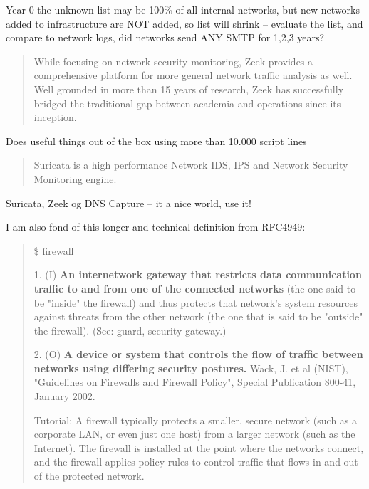 \documentclass[Screen16to9,17pt]{foils}
\begin{document}
Year 0 the unknown list may be 100\% of all internal networks, but new networks added to infrastructure are NOT added, so list will shrink -- evaluate the list, and compare to network logs, did networks send ANY SMTP for 1,2,3 years?



\begin{quote}
While focusing on network security monitoring, Zeek provides a comprehensive platform for more general network traffic analysis as well. Well grounded in more than 15 years of research, Zeek has successfully bridged the traditional gap between academia and operations since its inception.
\end{quote}

Does useful things out of the box using more than 10.000 script lines


\begin{quote}
Suricata is a high performance Network IDS, IPS and Network Security Monitoring engine.
\end{quote}


Suricata, Zeek og DNS Capture -- it a nice world, use it!\\
{\small{}}




I am also fond of this longer and technical definition from RFC4949:
\begin{quote}
\$ firewall

      1. (I) {\bf An internetwork gateway that restricts data communication
      traffic to and from one of the connected networks} (the one said to
      be "inside" the firewall) and thus protects that network's system
      resources against threats from the other network (the one that is
      said to be "outside" the firewall). (See: guard, security
      gateway.)

      2. (O) {\bf A device or system that controls the flow of traffic
      between networks using differing security postures.} Wack, J. et al (NIST), "Guidelines on Firewalls and Firewall Policy", Special Publication 800-41,
      January 2002.

      Tutorial: A firewall typically protects a smaller, secure network
      (such as a corporate LAN, or even just one host) from a larger
      network (such as the Internet). The firewall is installed at the
      point where the networks connect, and the firewall applies policy
      rules to control traffic that flows in and out of the protected
      network.
\end{quote}
\end{document}
